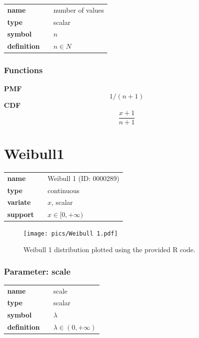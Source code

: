 \documentclass{article}
\begin{document}
\noindent\begin{tabular}{p{2cm}cl}
\textbf{name} & & number of values \\
\textbf{type} & & scalar \\
\textbf{symbol} & & $n$  \\
\textbf{definition} & & $n \in N$
\end{tabular}
\subsubsection*{Functions}

\smallskip \noindent \hspace{.2cm} \textbf{PMF} 
\begin{equation*}1/(n+1)\end{equation*}
\smallskip \noindent \hspace{.2cm} \textbf{CDF} 
\begin{equation*}\frac{x+1}{n+1}\end{equation*}
\smallskip\section*{Weibull1} 

  \bigskip 

\begin{tabular}{p{2cm}cl}
\textbf{name} & & Weibull 1 (ID: 0000289)\\ 
 
\textbf{type} & & continuous \\ 

\textbf{variate} & & $x$, scalar \\ 

\textbf{support} & & $x \in [0,+\infty)$
\end{tabular}

\begin{figure}[ht!]
\centering
  \texttt{[image: pics/Weibull 1.pdf]}
 \caption{Weibull 1 distribution plotted using the provided R code.}
 \label{fig:Weibull 1}
\end{figure}

\subsubsection*{Parameter: scale}

\noindent\begin{tabular}{p{2cm}cl}
\textbf{name} & & scale \\
\textbf{type} & & scalar \\
\textbf{symbol} & & $\lambda$  \\
\textbf{definition} & & $\lambda\in (0, +\infty)$
\end{tabular}
\end{document}
